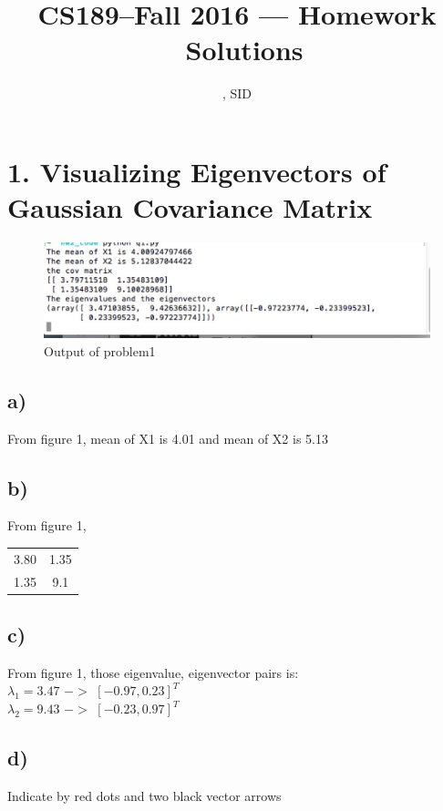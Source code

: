 \documentclass[11pt]{article}
\title{CS189--Fall 2016 --- Homework \Homework\ Solutions}
\author{\Name, SID \SID}
\date{}
\begin{document}
\maketitle


\section*{1. Visualizing Eigenvectors of Gaussian Covariance Matrix}
\begin{figure}[H]
\begin{center}
\includegraphics[scale=0.3]{q1}
\caption{Output of problem1}
\end{center}
\end{figure}
\subsection*{a)}
From figure 1, mean of X1 is 4.01 and mean of X2 is 5.13
\subsection*{b)}
From figure 1, 
\begin{center}
  \begin{tabular}{ | c c | }
 
    3.80 & 1.35 \\ 
    1.35 & 9.1 \\ 

  \end{tabular}
\end{center}
\subsection*{c)}
From figure 1, those eigenvalue, eigenvector pairs is:\\
$\lambda_1 = 3.47$ $->$ $[-0.97, 0.23]^T$\\
$\lambda_2 = 9.43$ $->$ $[-0.23, 0.97]^T$
\newpage
\subsection*{d)}
Indicate by red dots and two black vector arrows
\end{document}
